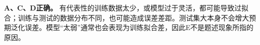 \textbf{A、C、D正确。} 有代表性的训练数据太少，或模型过于灵活，都可能导致过拟合；训练与测试的数据分布不同，也可能造成误差差距。测试集大本身不会增大预期泛化误差。模型“太弱”通常也会表现为训练拟合差，因此E不是题述现象所指的原因。
